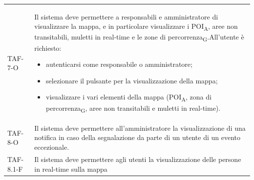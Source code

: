 \begin{longtable}{ >{\centering}p{} >{}p{}}
	TAF-7-O & Il sistema deve permettere a responsabili e amministratore di visualizzare la mappa, e in particolare visualizzare i POI\textsubscript{A}, aree non transitabili, muletti in real-time e le zone di percorrenza\textsubscript{G}.\newline All'utente è richiesto:\begin{itemize} \item autenticarsi come responsabile o amministratore; \item selezionare il pulsante per la visualizzazione della mappa; \item visualizzare i vari elementi della mappa (POI\textsubscript{A}, zona di percorrenza\textsubscript{G}, aree non transitabili e muletti in real-time). \end{itemize}\tabularnewline

	TAF-8-O & Il sistema deve permettere all'amministratore la visualizzazione di una notifica in caso della segnalazione da parte di un utente di un evento eccezionale.\tabularnewline
	
	TAF-8.1-F & Il sistema deve permettere agli utenti la visualizzazione delle persone in real-time sulla mappa\tabularnewline


\end{longtable}
